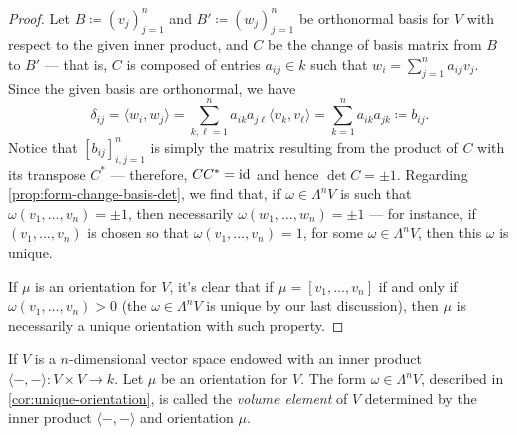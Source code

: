 \begin{proof}
Let \(B \coloneq (v_j)_{j=1}^n\) and \(B' \coloneq (w_j)_{j=1}^n\) be
orthonormal basis for \(V\) with respect to the given inner product, and \(C\)
be the change of basis matrix from \(B\) to \(B'\) --- that is, \(C\) is
composed of entries \(a_{ij} \in k\) such that \(w_i = \sum_{j=1}^n a_{ij}v_j\).
Since the given basis are orthonormal, we have
\[
  \delta_{i j} = \langle w_i, w_j \rangle
  = \sum_{k, \ell = 1}^n a_{i k} a_{j \ell} \langle v_k, v_{\ell} \rangle
  = \sum_{k=1}^n a_{i k} a_{j k}
  \coloneq b_{i j}.
\]
Notice that \([b_{ij}]_{i,j=1}^n\) is simply the matrix resulting from the
product of \(C\) with its transpose \(C^{*}\) --- therefore, \(C C^{*} = \operatorname{id}\)
and hence \(\det C = \pm 1\). Regarding \cref{prop:form-change-basis-det}, we
find that, if \(\omega \in \Lambda^{n} V\) is such that \(\omega(v_1, \dots,
v_n) = \pm 1\), then necessarily \(\omega(w_1, \dots, w_n) = \pm 1\) --- for
instance, if \((v_1, \dots, v_n)\) is chosen so that \(\omega(v_1, \dots, v_n)
= 1\), for some \(\omega \in \Lambda^n V\), then this \(\omega\) is unique.

If \(\mu\) is an orientation for \(V\), it's clear that if \(\mu = [v_1, \dots,
v_n]\) if and only if \(\omega(v_1, \dots, v_n) > 0\) (the \(\omega \in
\Lambda^n V\) is unique by our last discussion), then \(\mu\) is necessarily a
unique orientation with such property.
\end{proof}

\begin{definition}
\label{def:volume-element-vector-space}
If \(V\) is a \(n\)-dimensional vector space endowed with an inner product
\(\langle -, - \rangle: V \times V \to k\). Let \(\mu\) be an orientation for
\(V\). The form \(\omega \in \Lambda^n V\), described in
\cref{cor:unique-orientation}, is called the \emph{volume element} of \(V\)
determined by the inner product \(\langle -, - \rangle\) and orientation
\(\mu\).
\end{definition}



